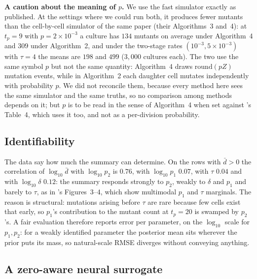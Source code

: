 \documentclass[sn-basic,iicol,pdflatex]{sn-jnl}
\begin{document}
\noindent\textbf{A caution about the meaning of $p$.} We use the fast simulator
exactly as published. At the settings where we could run both, it produces
fewer mutants than the cell-by-cell simulator of the same paper (their
Algorithms~3 and~4): at $t_p=9$ with $p=2\times10^{-3}$ a culture has $134$
mutants on average under Algorithm~4 and $309$ under Algorithm~2, and under the
two-stage rates $(10^{-3},5\times10^{-3})$ with $\tau=4$ the means are $198$ and
$499$ ($3{,}000$ cultures each). The two use the same symbol $p$ but not the
same quantity: Algorithm~4 draws $\mathrm{round}(pZ)$ mutation events, while in
Algorithm~2 each daughter cell mutates independently with probability $p$. We
did not reconcile them, because every method here sees the same simulator and
the same truths, so no comparison among methods depends on it; but $p$ is to be
read in the sense of Algorithm~4 when set against \citeauthor{lu2023}'s Table~4,
which uses it too, and not as a per-division probability.

\subsection{Identifiability}
\label{sec:sim3D_identifiability}

The data say how much the summary can determine. On the rows with $\bar d>0$ the
correlation of $\log_{10}\bar d$ with $\log_{10}p_2$ is $0.76$, with
$\log_{10}p_1$ $0.07$, with $\tau$ $0.04$ and with $\log_{10}\delta$ $0.12$: the summary responds strongly to $p_2$, weakly to
$\delta$ and $p_1$ and barely to $\tau$, as in
\citeauthor{lu2023}'s Figures~3--4, which show multimodal $p_1$ and $\tau$
marginals. The reason is structural: mutations arising before $\tau$ are rare
because few cells exist that early, so $p_1$'s contribution to the mutant count
at $t_p=20$ is swamped by $p_2$'s. A fair evaluation therefore reports error
per parameter, on the $\log_{10}$ scale for $p_1,p_2$: for a weakly identified
parameter the posterior mean sits wherever the prior puts its mass, so
natural-scale RMSE diverges without conveying anything.

\subsection{A zero-aware neural surrogate}
\label{sec:hurdle}
\end{document}
